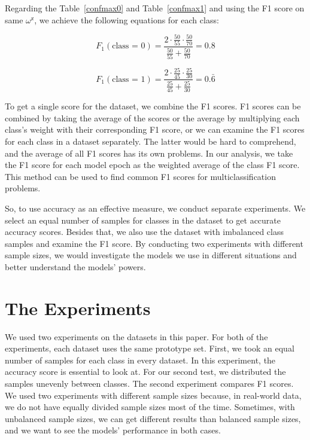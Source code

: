 Regarding the Table~\ref{confmax0} and Table~\ref{confmax1} and using the F1 score on same $\omega^{\mathbb{x}}$, we achieve the following equations for each class:
\vspace{10pt}

\begin{equation}
F_{1}(\text{class = 0}) = \frac{2\cdot\frac{50}{55}\cdot\frac{50}{70}}{\frac{50}{55}+\frac{50}{70}}= 0.8
\end{equation}
\vspace{5pt}

\begin{equation}
F_{1}(\text{class = 1}) = \frac{2\cdot\frac{25}{45}\cdot\frac{25}{30}}{\frac{25}{45}+\frac{25}{30}}= 0.\bar{6}
\end{equation}
\vspace{10pt}

To get a single score for the dataset, we combine the F1 scores. F1 scores can be combined by taking the average of the scores or the average by multiplying each class’s weight with their corresponding F1 score, or we can examine the F1 scores for each class in a dataset separately. The latter would be hard to comprehend, and the average of all F1 scores has its own problems. In our analysis, we take the F1 score for each model epoch as the weighted average of the class F1 score. This method can be used to find common F1 scores for multiclassification problems.

So, to use accuracy as an effective measure, we conduct separate experiments. We select an equal number of samples for classes in the dataset to get accurate accuracy scores. Besides that, we also use the dataset with imbalanced class samples and examine the F1 score. By conducting two experiments with different sample sizes, we would investigate the models we use in different situations and better understand the models’ powers.

\section{The Experiments}

We used two experiments on the datasets in this paper. For both of the experiments, each dataset uses the same prototype set. First, we took an equal number of samples for each class in every dataset. In this experiment, the accuracy score is essential to look at. For our second test, we distributed the samples unevenly between classes. The second experiment compares F1 scores. We used two experiments with different sample sizes because, in real-world data, we do not have equally divided sample sizes most of the time. Sometimes, with unbalanced sample sizes, we can get different results than balanced sample sizes, and we want to see the models’ performance in both cases.


